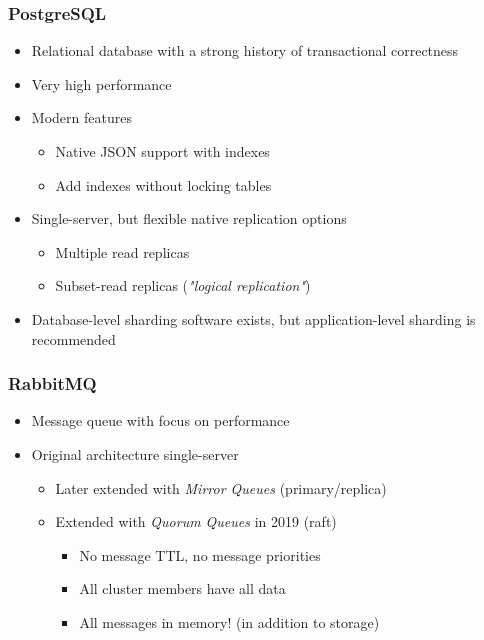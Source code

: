 \documentclass[8pt]{article}
\begin{document}
\subsubsection{PostgreSQL}
\label{sec:org1cac62d}
\begin{itemize}
\item Relational database with a strong history of transactional correctness
\item Very high performance
\item Modern features
\begin{itemize}
\item Native JSON support with indexes
\item Add indexes without locking tables
\end{itemize}
\item Single-server, but flexible native replication options
\begin{itemize}
\item Multiple read replicas
\item Subset-read replicas (\emph{"logical replication"})
\end{itemize}
\item Database-level sharding software exists, but application-level sharding is recommended
\end{itemize}
\subsubsection{RabbitMQ}
\label{sec:org162fc7c}
\begin{itemize}
\item Message queue with focus on performance
\item Original architecture single-server
\begin{itemize}
\item Later extended with \emph{Mirror Queues} (primary/replica)
\item Extended with \emph{Quorum Queues} in 2019 (raft)
\begin{itemize}
\item No message TTL, no message priorities
\item All cluster members have all data
\item All messages in memory! (in addition to storage)
\end{itemize}
\end{itemize}
\end{itemize}
\end{document}
